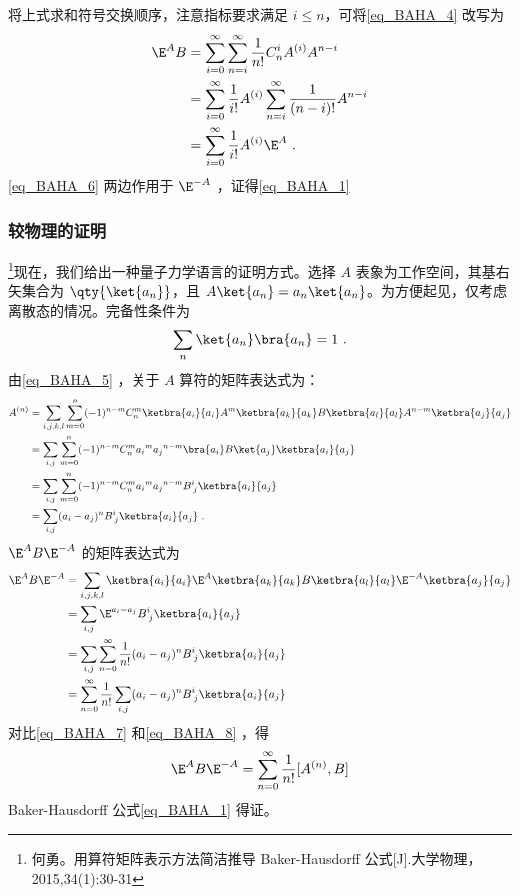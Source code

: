 将上式求和符号交换顺序，注意指标要求满足 $i\leq n$，可将\autoref{eq_BAHA_4} 改写为
\begin{equation}\label{eq_BAHA_6}
\begin{aligned}
\E^A B&=\sum_{i=0}^{\infty}\sum_{n=i}^{\infty}\frac{1}{n!}C_{n}^iA^{(i)}A^{n-i}\\
&=\sum_{i=0}^{\infty}\frac{1}{i!}A^{(i)}\sum_{n=i}^{\infty}\frac{1}{(n-i)!}A^{n-i}\\
&=\sum_{i=0}^{\infty}\frac{1}{i!}A^{(i)}\E^A~.
\end{aligned}
\end{equation}
\autoref{eq_BAHA_6} 两边作用于 $\E^{-A}$ ，证得\autoref{eq_BAHA_1} 

\subsubsection{较物理的证明}
\footnote{何勇。用算符矩阵表示方法简洁推导 Baker-Hausdorff 公式[J].大学物理，2015,34(1):30-31}现在，我们给出一种量子力学语言的证明方式。选择 $A$ 表象为工作空间，其基右矢集合为 $\qty{\ket{a_n}}$，且 $A\ket{a_n}=a_n\ket{a_n}$。为方便起见，仅考虑离散态的情况。完备性条件为
\begin{equation}
\sum_{n}\ket{a_n}\bra{a_n}=1~.
\end{equation}
由\autoref{eq_BAHA_5} ，关于 $A$ 算符的矩阵表达式为：
\begin{equation}\label{eq_BAHA_7}
\begin{aligned}
A^{(n)}&=\sum_{i,j,k,l}\sum_{m=0}^{n}(-1)^{n-m}C_{n}^{m}\ketbra{a_i}{a_i}A^m\ketbra{a_k}{a_k}B\ketbra{a_l}{a_l}A^{n-m}\ketbra{a_j}{a_j}\\
&=\sum_{i,j}\sum_{m=0}^{n}(-1)^{n-m}C_n^m{a_i}^m{a_j}^{n-m}\bra{a_i}B\ket{a_j}\ketbra{a_i}{a_j}\\
&=\sum_{i,j}\sum_{m=0}^{n}(-1)^{n-m}C_n^m{a_i}^m{a_j}^{n-m}B^i_{\; j}\ketbra{a_i}{a_j}\\
&=\sum_{i,j}(a_i-a_j)^nB^i_{\; j}\ketbra{a_i}{a_j}~.
\end{aligned}
\end{equation}
$\E^{A}B\E^{-A}$ 的矩阵表达式为
\begin{equation}\label{eq_BAHA_8}
\begin{aligned}
\E^{A}B\E^{-A}&=\sum_{i,j,k,l}\ketbra{a_i}{a_i}\E^{A}\ketbra{a_k}{a_k}B\ketbra{a_l}{a_l}\E^{-A}\ketbra{a_j}{a_j}\\
&=\sum_{i,j}\E^{a_i-a_j}B^{i}_{\;j}\ketbra{a_i}{a_j}\\
&=\sum_{i,j}\sum_{n=0}^{\infty}\frac{1}{n!}(a_i-a_j)^nB^{i}_{\;j}\ketbra{a_i}{a_j}\\
&=\sum_{n=0}^{\infty}\frac{1}{n!}\sum_{i,j}(a_i-a_j)^nB^{i}_{\;j}\ketbra{a_i}{a_j}
\end{aligned}
\end{equation}
对比\autoref{eq_BAHA_7} 和\autoref{eq_BAHA_8} ，得
\begin{equation}
\E^{A}B\E^{-A}=\sum_{n=0}^{\infty}\frac{1}{n!}[A^{(n)},B]
\end{equation}
Baker-Hausdorff 公式\autoref{eq_BAHA_1} 得证。

